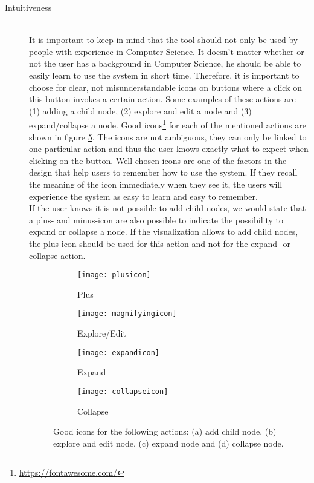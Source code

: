 \begin{description}
	\item[Intuitiveness] \hfill \\
	It is important to keep in mind that the tool should not only be used by people with experience in Computer Science. It doesn't matter whether or not the user has a background in Computer Science, he should be able to easily learn to use the system in short time. Therefore, it is important to choose for clear, not misunderstandable icons on buttons where a click on this button invokes a certain action. Some examples of these actions are (1) adding a child node, (2) explore and edit a node and (3) expand/collapse a node. Good icons\footnote{\url{https://fontawesome.com/}} for each of the mentioned actions are shown in figure \ref{fig:icons}. The icons are not ambiguous, they can only be linked to one particular action and thus the user knows exactly what to expect when clicking on the button. Well chosen icons are one of the factors in the design that help users to remember how to use the system. If they recall the meaning of the icon immediately when they see it, the users will experience the system as easy to learn and easy to remember.\\
	
	If the user knows it is not possible to add child nodes, we would state that a plus- and minus-icon are also possible to indicate the possibility to expand or collapse a node. If the visualization allows to add child nodes, the plus-icon should be used for this action and not for the expand- or collapse-action.

\begin{figure}[H]
	\centering
	\begin{subfigure}{.2\textwidth}
  		\centering
  		\texttt{[image: plusicon]}
  		\caption{Plus}
  		\label{fig:plusicon}
	\end{subfigure}%
	\begin{subfigure}{.2\textwidth}
  		\centering
  		\texttt{[image: magnifyingicon]}
  		\caption{Explore/Edit}
  		\label{fig:editicon}
	\end{subfigure}
	\begin{subfigure}{.2\textwidth}
  		\centering
  		\texttt{[image: expandicon]}
  		\caption{Expand}
  		\label{fig:expandicon}
	\end{subfigure}
	\begin{subfigure}{.2\textwidth}
  		\centering
  		\texttt{[image: collapseicon]}
  		\caption{Collapse}
  		\label{fig:collapseicon}
	\end{subfigure}
	\caption{Good icons for the following actions: (a) add child node, (b) explore and edit node, (c) expand node and (d) collapse node.}
	\label{fig:icons}
\end{figure}
	
\end{description}



